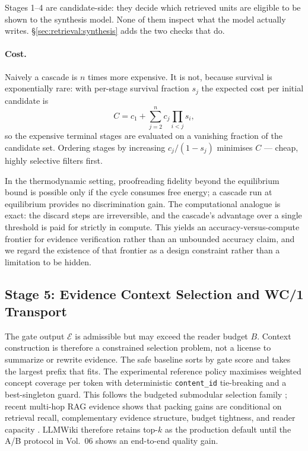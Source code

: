 Stages 1--4 are candidate-side: they decide which retrieved units are eligible to be shown to the synthesis model. None of them inspect what the model actually writes. \S\ref{sec:retrieval:synthesis} adds the two checks that do.

\paragraph{Cost.} Naively a cascade is $n$ times more expensive. It is not, because survival is exponentially rare: with per-stage survival fraction $s_j$ the expected cost per initial candidate is
\begin{equation}
C = c_1 + \sum_{j=2}^{n} c_j \prod_{i<j} s_i ,
\end{equation}
so the expensive terminal stages are evaluated on a vanishing fraction of the candidate set. Ordering stages by increasing $c_j / (1 - s_j)$ minimises $C$ --- cheap, highly selective filters first.

\begin{observation}
\label{obs:dissipation}
In the thermodynamic setting, proofreading fidelity beyond the equilibrium bound is possible only if the cycle consumes free energy; a cascade run at equilibrium provides no discrimination gain. The computational analogue is exact: the discard steps are irreversible, and the cascade's advantage over a single threshold is paid for strictly in compute. This yields an accuracy-versus-compute frontier for evidence verification rather than an unbounded accuracy claim, and we regard the existence of that frontier as a design constraint rather than a limitation to be hidden.
\end{observation}

\subsection{Stage 5: Evidence Context Selection and WC/1 Transport}
\label{sec:retrieval:context-shaping}

The gate output $\mathcal{E}$ is admissible but may exceed the reader budget
$B$. Context construction is therefore a constrained selection problem, not a
license to summarize or rewrite evidence. The safe baseline sorts by gate score
and takes the largest prefix that fits. The experimental reference policy
maximises weighted concept coverage per token with deterministic
\texttt{content\_id} tie-breaking and a best-singleton guard. This follows the
budgeted submodular selection family \citep{lin2010budgeted,peng2025adagres};
recent multi-hop RAG evidence shows that packing gains are conditional on
retrieval recall, complementary evidence structure, budget tightness, and
reader capacity \citep{bala2026survives}. LLMWiki therefore retains top-$k$ as
the production default until the A/B protocol in Vol.~06 shows an end-to-end
quality gain.

